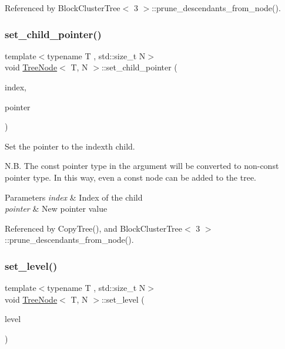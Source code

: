 Referenced by Block\+Cluster\+Tree$<$ 3 $>$\+::prune\+\_\+descendants\+\_\+from\+\_\+node().

\mbox{\label{classTreeNode_a3d2f374424a723cb72409857ee5237bc}} 
\subsubsection{\texorpdfstring{set\+\_\+child\+\_\+pointer()}{set\_child\_pointer()}}
{\footnotesize\ttfamily template$<$typename T , std\+::size\+\_\+t N$>$ \\
void \hyperlink{classTreeNode}{Tree\+Node}$<$ T, N $>$\+::set\+\_\+child\+\_\+pointer (\begin{DoxyParamCaption}\item[{std\+::size\+\_\+t}]{index,  }\item[{const \hyperlink{classTreeNode}{Tree\+Node}$<$ T, N $>$ $\ast$}]{pointer }\end{DoxyParamCaption})}

Set the pointer to the {\ttfamily index\textquotesingle{}th} child.

N.\+B. The const pointer type in the argument will be converted to non-\/const pointer type. In this way, even a const node can be added to the tree. 
\begin{DoxyParams}{Parameters}
{\em index} & Index of the child \\
\hline
{\em pointer} & New pointer value \\
\hline
\end{DoxyParams}


Referenced by Copy\+Tree(), and Block\+Cluster\+Tree$<$ 3 $>$\+::prune\+\_\+descendants\+\_\+from\+\_\+node().

\mbox{\label{classTreeNode_a67e5762f796247c38f4a2560c1250b11}} 
\subsubsection{\texorpdfstring{set\+\_\+level()}{set\_level()}}
{\footnotesize\ttfamily template$<$typename T , std\+::size\+\_\+t N$>$ \\
void \hyperlink{classTreeNode}{Tree\+Node}$<$ T, N $>$\+::set\+\_\+level (\begin{DoxyParamCaption}\item[{const unsigned int}]{level }\end{DoxyParamCaption})}

